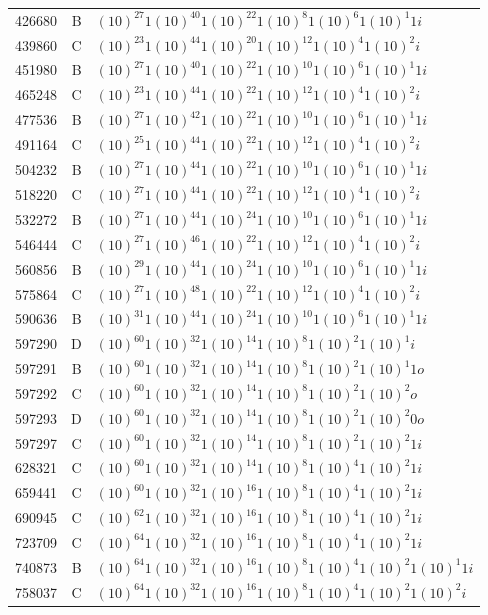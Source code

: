 \documentclass[12pt]{article}
\begin{document}
\begin{table}[H]
\begin{Parallel}[c]{0.48\textwidth}{0.48\textwidth}
{{\begin{tiny}
\begin{tabular}{rrl}
426680&B&$(10)^{27}1(10)^{40}1(10)^{22}1(10)^{8}1(10)^{6}1(10)^{1}1i$\\
439860&C&$(10)^{23}1(10)^{44}1(10)^{20}1(10)^{12}1(10)^{4}1(10)^{2}i$\\
451980&B&$(10)^{27}1(10)^{40}1(10)^{22}1(10)^{10}1(10)^{6}1(10)^{1}1i$\\
465248&C&$(10)^{23}1(10)^{44}1(10)^{22}1(10)^{12}1(10)^{4}1(10)^{2}i$\\
477536&B&$(10)^{27}1(10)^{42}1(10)^{22}1(10)^{10}1(10)^{6}1(10)^{1}1i$\\
491164&C&$(10)^{25}1(10)^{44}1(10)^{22}1(10)^{12}1(10)^{4}1(10)^{2}i$\\
504232&B&$(10)^{27}1(10)^{44}1(10)^{22}1(10)^{10}1(10)^{6}1(10)^{1}1i$\\
518220&C&$(10)^{27}1(10)^{44}1(10)^{22}1(10)^{12}1(10)^{4}1(10)^{2}i$\\
532272&B&$(10)^{27}1(10)^{44}1(10)^{24}1(10)^{10}1(10)^{6}1(10)^{1}1i$\\
546444&C&$(10)^{27}1(10)^{46}1(10)^{22}1(10)^{12}1(10)^{4}1(10)^{2}i$\\
560856&B&$(10)^{29}1(10)^{44}1(10)^{24}1(10)^{10}1(10)^{6}1(10)^{1}1i$\\
575864&C&$(10)^{27}1(10)^{48}1(10)^{22}1(10)^{12}1(10)^{4}1(10)^{2}i$\\
590636&B&$(10)^{31}1(10)^{44}1(10)^{24}1(10)^{10}1(10)^{6}1(10)^{1}1i$\\
597290&D&$(10)^{60}1(10)^{32}1(10)^{14}1(10)^{8}1(10)^{2}1(10)^{1}i$\\
597291&B&$(10)^{60}1(10)^{32}1(10)^{14}1(10)^{8}1(10)^{2}1(10)^{1}1o$\\
597292&C&$(10)^{60}1(10)^{32}1(10)^{14}1(10)^{8}1(10)^{2}1(10)^{2}o$\\
597293&D&$(10)^{60}1(10)^{32}1(10)^{14}1(10)^{8}1(10)^{2}1(10)^{2}0o$\\
597297&C&$(10)^{60}1(10)^{32}1(10)^{14}1(10)^{8}1(10)^{2}1(10)^{2}1i$\\
628321&C&$(10)^{60}1(10)^{32}1(10)^{14}1(10)^{8}1(10)^{4}1(10)^{2}1i$\\
659441&C&$(10)^{60}1(10)^{32}1(10)^{16}1(10)^{8}1(10)^{4}1(10)^{2}1i$\\
690945&C&$(10)^{62}1(10)^{32}1(10)^{16}1(10)^{8}1(10)^{4}1(10)^{2}1i$\\
723709&C&$(10)^{64}1(10)^{32}1(10)^{16}1(10)^{8}1(10)^{4}1(10)^{2}1i$\\
740873&B&$(10)^{64}1(10)^{32}1(10)^{16}1(10)^{8}1(10)^{4}1(10)^{2}1(10)^{1}1i$\\
758037&C&$(10)^{64}1(10)^{32}1(10)^{16}1(10)^{8}1(10)^{4}1(10)^{2}1(10)^{2}i$\\

\end{tabular}
\end{tiny}}}
\end{Parallel}
\end{table}
\end{document}
